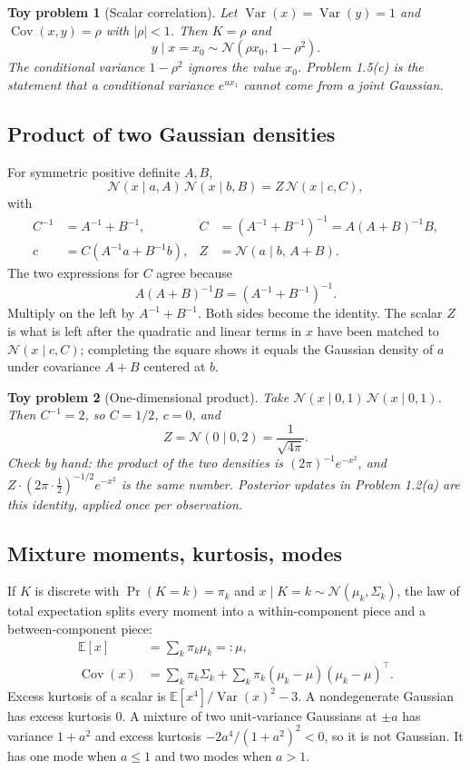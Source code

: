 \documentclass[11pt]{article}
\newtheorem{toy}{Toy problem}
\theoremstyle{remark}
\newcommand{\E}{\mathbb{E}}
\newcommand{\Var}{\operatorname{Var}}
\newcommand{\Cov}{\operatorname{Cov}}
\newcommand{\N}{\mathcal{N}}
\begin{document}
\begin{toy}[Scalar correlation]
Let \(\Var(x)=\Var(y)=1\) and \(\Cov(x,y)=\rho\) with \(|\rho|<1\). Then \(K=\rho\) and
\[
y\mid x=x_0\sim\N(\rho x_0,\,1-\rho^2).
\]
The conditional variance \(1-\rho^2\) ignores the value \(x_0\). Problem 1.5(c) is the statement that a conditional variance \(e^{ux_1}\) cannot come from a joint Gaussian.
\end{toy}

\subsection{Product of two Gaussian densities}

For symmetric positive definite \(A,B\),
\[
\N(x\mid a,A)\,\N(x\mid b,B)=Z\,\N(x\mid c,C),
\]
with
\begin{align*}
C^{-1}&=A^{-1}+B^{-1},&
C&=(A^{-1}+B^{-1})^{-1}=A(A+B)^{-1}B,\\
c&=C(A^{-1}a+B^{-1}b),&
Z&=\N(a\mid b,\,A+B).
\end{align*}
The two expressions for \(C\) agree because
\[
A(A+B)^{-1}B=(A^{-1}+B^{-1})^{-1}.
\]
Multiply on the left by \(A^{-1}+B^{-1}\). Both sides become the identity. The scalar \(Z\) is what is left after the quadratic and linear terms in \(x\) have been matched to \(\N(x\mid c,C)\); completing the square shows it equals the Gaussian density of \(a\) under covariance \(A+B\) centered at \(b\).

\begin{toy}[One-dimensional product]
Take \(\N(x\mid 0,1)\,\N(x\mid 0,1)\). Then \(C^{-1}=2\), so \(C=1/2\), \(c=0\), and
\[
Z=\N(0\mid 0,2)=\frac{1}{\sqrt{4\pi}}.
\]
Check by hand: the product of the two densities is \((2\pi)^{-1}e^{-x^2}\), and \(Z\cdot(2\pi\cdot\tfrac12)^{-1/2}e^{-x^2}\) is the same number. Posterior updates in Problem 1.2(a) are this identity, applied once per observation.
\end{toy}

\subsection{Mixture moments, kurtosis, modes}

If \(K\) is discrete with \(\Pr(K=k)=\pi_k\) and \(x\mid K=k\sim\N(\mu_k,\Sigma_k)\), the law of total expectation splits every moment into a within-component piece and a between-component piece:
\begin{align*}
\E[x]&=\sum_k\pi_k\mu_k=:\mu,\\
\Cov(x)&=\sum_k\pi_k\Sigma_k+\sum_k\pi_k(\mu_k-\mu)(\mu_k-\mu)^\top.
\end{align*}
Excess kurtosis of a scalar is \(\E[x^4]/\Var(x)^2-3\). A nondegenerate Gaussian has excess kurtosis \(0\). A mixture of two unit-variance Gaussians at \(\pm a\) has variance \(1+a^2\) and excess kurtosis \(-2a^4/(1+a^2)^2<0\), so it is not Gaussian. It has one mode when \(a\le 1\) and two modes when \(a>1\).
\end{document}
